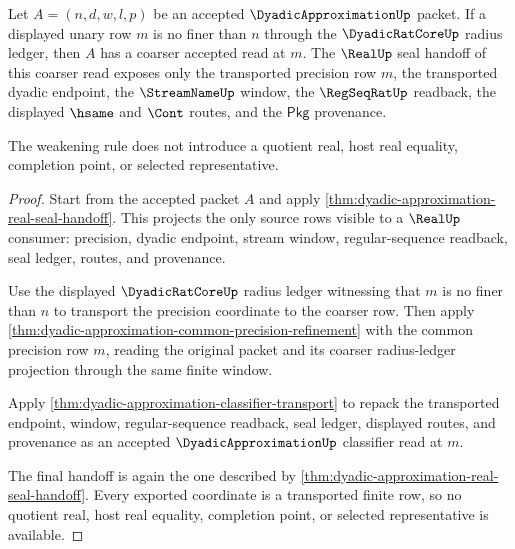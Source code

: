 \begin{theorem}\label{thm:dyadic-approximation-precision-weakening}
Let $A=(n,d,w,l,p)$ be an accepted $\DyadicApproximationUp$ packet. If a displayed unary row $m$ is no finer than $n$ through the $\DyadicRatCoreUp$ radius ledger, then $A$ has a coarser accepted read at $m$. The $\RealUp$ seal handoff of this coarser read exposes only the transported precision row $m$, the transported dyadic endpoint, the $\StreamNameUp$ window, the $\RegSeqRatUp$ readback, the displayed $\hsame$ and $\Cont$ routes, and the $\mathsf{Pkg}$ provenance.

The weakening rule does not introduce a quotient real, host real equality, completion point, or selected representative.
\end{theorem}
\begin{proof}
Start from the accepted packet $A$ and apply \autoref{thm:dyadic-approximation-real-seal-handoff}. This projects the only source rows visible to a $\RealUp$ consumer: precision, dyadic endpoint, stream window, regular-sequence readback, seal ledger, routes, and provenance.

Use the displayed $\DyadicRatCoreUp$ radius ledger witnessing that $m$ is no finer than $n$ to transport the precision coordinate to the coarser row. Then apply \autoref{thm:dyadic-approximation-common-precision-refinement} with the common precision row $m$, reading the original packet and its coarser radius-ledger projection through the same finite window.

Apply \autoref{thm:dyadic-approximation-classifier-transport} to repack the transported endpoint, window, regular-sequence readback, seal ledger, displayed routes, and provenance as an accepted $\DyadicApproximationUp$ classifier read at $m$.

The final handoff is again the one described by \autoref{thm:dyadic-approximation-real-seal-handoff}. Every exported coordinate is a transported finite row, so no quotient real, host real equality, completion point, or selected representative is available.
\end{proof}

